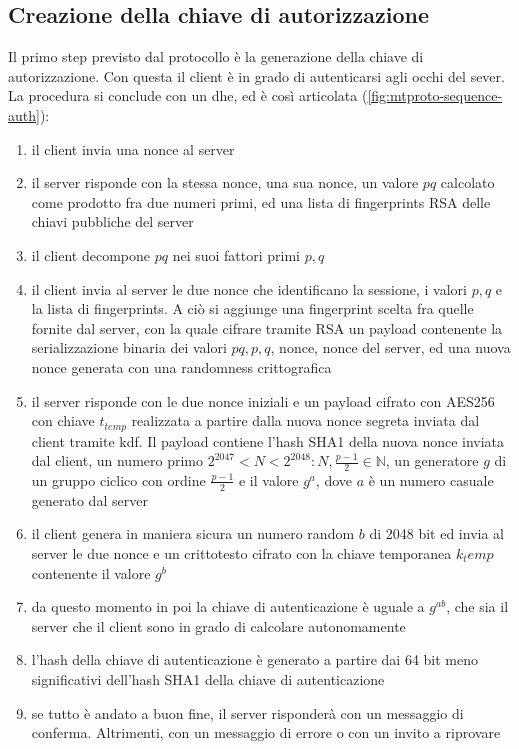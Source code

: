\subsection{Creazione della chiave di autorizzazione}
Il primo step previsto dal protocollo è la generazione della chiave di autorizzazione.
Con questa il client è in grado di autenticarsi agli occhi del sever. \\
La procedura si conclude con un \gls{dhe}, ed è così articolata (\autoref{fig:mtproto-sequence-auth}):
\begin{enumerate}
    \item il client invia una nonce al server
    \item il server risponde con la stessa nonce, una sua nonce, un valore $pq$ calcolato come prodotto fra due numeri primi,
          ed una lista di fingerprints RSA delle chiavi pubbliche del server
    \item il client decompone $pq$ nei suoi fattori primi $p, q$
    \item il client invia al server le due nonce che identificano la sessione, i valori $p, q$ e la lista di fingerprints.
          A ciò si aggiunge una fingerprint scelta fra quelle fornite dal server, con la quale cifrare tramite RSA un payload contenente
          la serializzazione binaria dei valori $pq, p, q$, nonce, nonce del server, ed una nuova nonce generata con una randomness crittografica
    \item il server risponde con le due nonce iniziali e un payload cifrato con AES256 con chiave $t_{temp}$ realizzata a partire dalla nuova nonce segreta inviata dal client tramite \gls{kdf}.
          Il payload contiene l'hash SHA1 della nuova nonce inviata dal client,
          un numero primo $2^{2047} < N < 2^{2048} : N, \frac{p-1}{2} \in \mathbb{N}$, un generatore $g$ di un gruppo ciclico con ordine $\frac{p-1}{2}$ e il valore $g^a$,
          dove $a$ è un numero casuale generato dal server
    \item il client genera in maniera sicura un numero random $b$ di 2048 bit ed invia al server le due nonce e un crittotesto
          cifrato con la chiave temporanea ${k_temp}$ contenente il valore $g^b$
    \item da questo momento in poi la chiave di autenticazione è uguale a $g^{ab}$, che sia il server che il client sono in grado di calcolare autonomamente
    \item l'hash della chiave di autenticazione è generato a partire dai 64 bit meno significativi dell'hash SHA1 della chiave di autenticazione
    \item se tutto è andato a buon fine, il server risponderà con un messaggio di conferma. Altrimenti, con un messaggio di errore o con un invito a riprovare
\end{enumerate}

